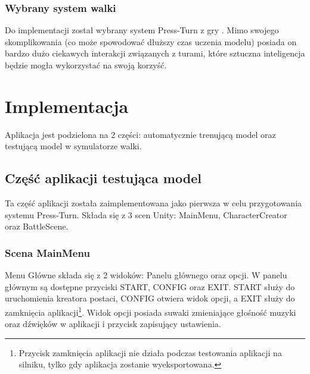 \documentclass{SGGW-thesis}
\begin{document}
\subsection*{Wybrany system walki}
Do implementacji został wybrany system Press-Turn z gry \cite{SMT3}. Mimo swojego skomplikowania (co może spowodować dłuższy czas uczenia modelu) posiada on bardzo dużo ciekawych interakcji związanych z turami, które sztuczna inteligencja będzie mogła wykorzystać na swoją korzyść.


\chapter{Implementacja}
Aplikacja jest podzielona na 2 części: automatycznie trenującą model oraz testującą model w symulatorze walki.


\section{Część aplikacji testująca model}
Ta część aplikacji została zaimplementowana jako pierwsza w celu przygotowania systemu Press-Turn. Składa się z 3 scen Unity: MainMenu, CharacterCreator oraz BattleScene.

\subsection{Scena MainMenu}
Menu Główne składa się z 2 widoków: Panelu głównego oraz opcji. W panelu głównym są dostępne przyciski START, CONFIG oraz EXIT. START służy do uruchomienia kreatora postaci, CONFIG otwiera widok opcji, a EXIT służy do zamknięcia aplikacji\footnote{Przycisk zamknięcia aplikacji nie działa podczas testowania aplikacji na silniku, tylko gdy aplikacja zostanie wyeksportowana.}.
Widok opcji posiada suwaki zmieniające głośność muzyki oraz dźwięków w aplikacji i przycisk zapisujący ustawienia.
\end{document}
